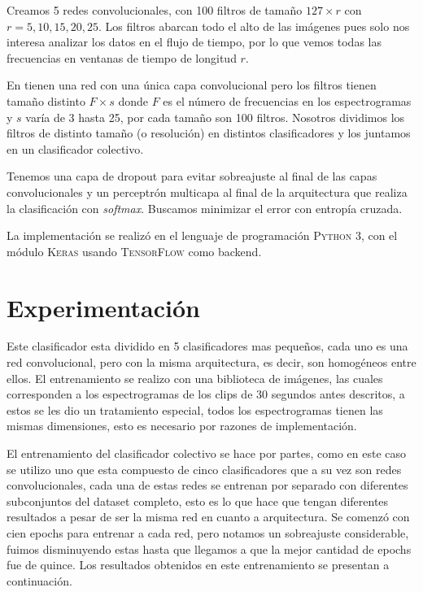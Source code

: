 \documentclass[spanish,11pt,letterpaper]{article}
\begin{document}
Creamos 5 redes convolucionales, con 100 filtros de tamaño $127 \times r$ con
$r = 5,10,15,20,25$. Los filtros abarcan todo el alto de las imágenes pues solo
nos interesa analizar los datos en el flujo de tiempo, por lo que vemos todas
las frecuencias en ventanas de tiempo de longitud $r$.

En \cite{audio_recognition} tienen una red con una única
capa convolucional pero los filtros tienen tamaño distinto $F \times s$ donde
$F$ es el número de frecuencias en los espectrogramas y $s$ varía de 3 hasta 25,
por cada tamaño son 100 filtros. Nosotros dividimos los filtros de distinto
tamaño (o resolución) en distintos clasificadores y los juntamos en un clasificador
colectivo.

Tenemos una capa de dropout para evitar sobreajuste al final de las capas
convolucionales y un perceptrón multicapa al final de la arquitectura que realiza
la clasificación con \textit{softmax}. Buscamos minimizar el error con
entropía cruzada.

La implementación se realizó en el lenguaje de programación \textsc{Python 3},
con el módulo \textsc{Keras} usando \textsc{TensorFlow} como backend.

\section{Experimentación}

Este clasificador esta dividido en 5 clasificadores mas pequeños, cada uno es una red convolucional, pero con la
misma arquitectura, es decir, son homogéneos entre ellos. El entrenamiento se realizo con una biblioteca de
imágenes, las cuales corresponden a los espectrogramas de los clips de 30 segundos antes descritos, a estos se les
dio un tratamiento especial, todos los espectrogramas tienen las mismas dimensiones, esto es necesario por razones
de implementación.

El entrenamiento del clasificador colectivo se hace por partes, como en este caso se utilizo uno que esta
compuesto de cinco clasificadores que a su vez son redes convolucionales, cada una de estas redes se entrenan por
separado con diferentes subconjuntos del dataset completo, esto es lo que hace que tengan diferentes resultados a
pesar de ser la misma red en cuanto a arquitectura. Se comenzó con cien epochs para entrenar a cada red, pero
notamos un sobreajuste considerable, fuimos disminuyendo estas hasta que llegamos a que la mejor cantidad de
epochs fue de quince. Los resultados obtenidos en este entrenamiento se presentan a continuación.
\end{document}
